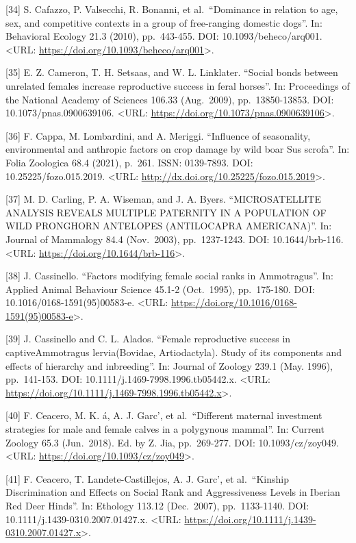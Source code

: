 \documentclass[
]{article}
\begin{document}
{[}34{]} S. Cafazzo, P. Valsecchi, R. Bonanni, et al.~``Dominance in
relation to age, sex, and competitive contexts in a group of
free-ranging domestic dogs''. In: Behavioral Ecology 21.3 (2010),
pp.~443-455. DOI: 10.1093/beheco/arq001. \textless URL:
\url{https://doi.org/10.1093/beheco/arq001}\textgreater.

{[}35{]} E. Z. Cameron, T. H. Setsaas, and W. L. Linklater. ``Social
bonds between unrelated females increase reproductive success in feral
horses''. In: Proceedings of the National Academy of Sciences 106.33
(Aug.~2009), pp.~13850-13853. DOI: 10.1073/pnas.0900639106.
\textless URL:
\url{https://doi.org/10.1073/pnas.0900639106}\textgreater.

{[}36{]} F. Cappa, M. Lombardini, and A. Meriggi. ``Influence of
seasonality, environmental and anthropic factors on crop damage by wild
boar Sus scrofa''. In: Folia Zoologica 68.4 (2021), p.~261. ISSN:
0139-7893. DOI: 10.25225/fozo.015.2019. \textless URL:
\url{http://dx.doi.org/10.25225/fozo.015.2019}\textgreater.

{[}37{]} M. D. Carling, P. A. Wiseman, and J. A. Byers. ``MICROSATELLITE
ANALYSIS REVEALS MULTIPLE PATERNITY IN A POPULATION OF WILD PRONGHORN
ANTELOPES (ANTILOCAPRA AMERICANA)''. In: Journal of Mammalogy 84.4
(Nov.~2003), pp.~1237-1243. DOI: 10.1644/brb-116. \textless URL:
\url{https://doi.org/10.1644/brb-116}\textgreater.

{[}38{]} J. Cassinello. ``Factors modifying female social ranks in
Ammotragus''. In: Applied Animal Behaviour Science 45.1-2 (Oct.~1995),
pp.~175-180. DOI: 10.1016/0168-1591(95)00583-e. \textless URL:
\url{https://doi.org/10.1016/0168-1591(95)00583-e}\textgreater.

{[}39{]} J. Cassinello and C. L. Alados. ``Female reproductive success
in captiveAmmotragus lervia(Bovidae, Artiodactyla). Study of its
components and effects of hierarchy and inbreeding''. In: Journal of
Zoology 239.1 (May. 1996), pp.~141-153. DOI:
10.1111/j.1469-7998.1996.tb05442.x. \textless URL:
\url{https://doi.org/10.1111/j.1469-7998.1996.tb05442.x}\textgreater.

{[}40{]} F. Ceacero, M. K. á, A. J. Garc', et al.~``Different maternal
investment strategies for male and female calves in a polygynous
mammal''. In: Current Zoology 65.3 (Jun.~2018). Ed. by Z. Jia,
pp.~269-277. DOI: 10.1093/cz/zoy049. \textless URL:
\url{https://doi.org/10.1093/cz/zoy049}\textgreater.

{[}41{]} F. Ceacero, T. Landete-Castillejos, A. J. Garc', et
al.~``Kinship Discrimination and Effects on Social Rank and
Aggressiveness Levels in Iberian Red Deer Hinds''. In: Ethology 113.12
(Dec.~2007), pp.~1133-1140. DOI: 10.1111/j.1439-0310.2007.01427.x.
\textless URL:
\url{https://doi.org/10.1111/j.1439-0310.2007.01427.x}\textgreater.
\end{document}
